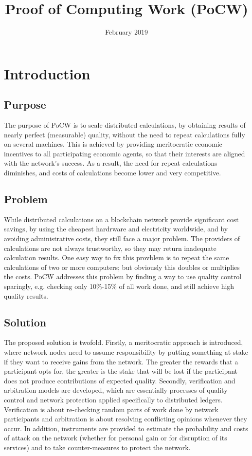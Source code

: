 \documentclass{article}
\title{Proof of Computing Work (PoCW)}
\date{February 2019}
\begin{document}
\maketitle

\section{Introduction}

\subsection{Purpose}

The purpose of PoCW is to scale distributed calculations, by obtaining
results of nearly perfect (measurable) quality, without the need to repeat
calculations fully on several machines. This is achieved by providing
meritocratic economic incentives to all participating economic agents, so
that their interests are aligned with the network's success. As a result,
the need for repeat calculations diminishes, and costs of calculations
become lower and very competitive.

\subsection{Problem}

While distributed calculations on a blockchain network provide significant
cost savings, by using the cheapest hardrware and electricity worldwide, and
by avoiding administrative costs, they still face a major problem. The
providers of calculations are not always trustworthy, so they may return
inadequate calculation results. One easy way to fix this provblem is to
repeat the same calculations of two or more computers; but obviously this
doubles or multiplies the costs. PoCW addresses this problem by finding a
way to use quality control sparingly, e.g. checking only 10\%-15\% of all
work done, and still achieve high quality results.

\subsection{Solution}

The proposed solution is twofold. Firstly, a meritocratic approach is
introduced, where network nodes need to assume responsibility by putting
something at stake if they want to receive gains from the network. The
greater the rewards that a participant opts for, the greater is the stake
that will be lost if the participant does not produce contributions of
expected quality. Secondly, verification and arbitration models are
developed, which are essentially processes of quality control and network
protection applied specifically to distributed ledgers. Verification is
about re-checking random parts of work done by network participants and
arbitration is about resolving conflicting opinions whenever they occur. In
addition, instruments are provided to estimate the probability and costs of
attack on the network (whether for personal gain or for disruption of its
services) and to take counter-measures to protect the network.
\end{document}

